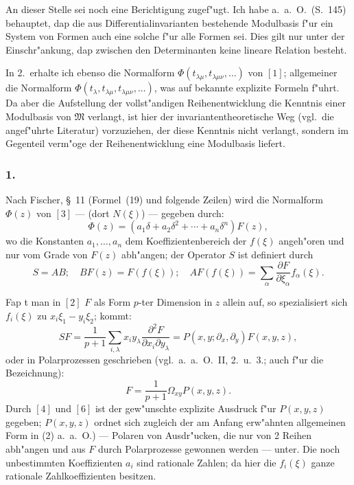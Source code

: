 \documentclass[12pt,a4paper]{article}
\begin{document}
An dieser Stelle sei noch eine Berichtigung zugef"ugt. Ich habe a.\ a.\ O.\ (S.~145) behauptet, dap die aus Differentialinvarianten bestehende Modulbasis f"ur ein System von Formen auch eine solche f"ur alle Formen sei. Dies gilt nur unter der Einschr"ankung, dap zwischen den Determinanten keine lineare Relation besteht.

In 2.\ erhalte ich ebenso die Normalform $\Phi(t_{\lambda\mu}, t_{\lambda\mu\nu}, \ldots)$ von $[1]$; allgemeiner die Normalform $\Phi(t_\lambda, t_{\lambda\mu}, t_{\lambda\mu\nu}, \ldots)$, was auf bekannte explizite Formeln f"uhrt. Da aber die Aufstellung der vollst"andigen Reihenentwicklung die Kenntnis einer Modulbasis von $\mathfrak{M}$ verlangt, ist hier der invariantentheoretische Weg (vgl.\ die angef"uhrte Literatur) vorzuziehen, der diese Kenntnis nicht verlangt, sondern im Gegenteil verm"oge der Reihenentwicklung eine Modulbasis liefert.

\subsubsection*{1.}

Nach Fischer, \S\ 11 (Formel~(19) und folgende Zeilen) wird die Normalform $\Phi(z)$ von $[3]$ --- (dort $N(\xi)$) --- gegeben durch:
\begin{equation}
\Phi(z) = (a_1\delta + a_2\delta^2 + \cdots + a_n\delta^n) F(z),
\end{equation}
wo die Konstanten $a_1,\ldots,a_n$ dem Koeffizientenbereich der $f(\xi)$ angeh"oren und nur vom Grade von $F(z)$ abh"angen; der Operator $S$ ist definiert durch
\begin{equation}
S = AB; \quad BF(z) = F(f(\xi)); \quad AF(f(\xi)) = \sum_\alpha \frac{\partial F}{\partial \xi_\alpha} f_\alpha(\xi).
\end{equation}

Fap t man in $[2]$ $F$ als Form $p$-ter Dimension in $z$ allein auf, so spezialisiert sich $f_i(\xi)$ zu $x_i\xi_1 - y_i\xi_2$; kommt:
\begin{equation}
SF = \frac{1}{p+1} \sum_{i,\lambda} x_i y_\lambda \frac{\partial^2 F}{\partial x_i \partial y_\lambda} = P(x,y;\partial_x,\partial_y) F(x,y,z),
\end{equation}
oder in Polarprozessen geschrieben (vgl.\ a.\ a.\ O.\ II, 2.\ u.\ 3.; auch f"ur die Bezeichnung):
\[
F = \frac{1}{p+1} \Omega_{xy} P(x,y,z).
\]
Durch $[4]$ und $[6]$ ist der gew"unschte explizite Ausdruck f"ur $P(x,y,z)$ gegeben; $P(x,y,z)$ ordnet sich zugleich der am Anfang erw"ahnten allgemeinen Form in (2) a.\ a.\ O.) --- Polaren von Ausdr"ucken, die nur von 2 Reihen abh"angen und aus $F$ durch Polarprozesse gewonnen werden --- unter. Die noch unbestimmten Koeffizienten $a_i$ sind rationale Zahlen; da hier die $f_i(\xi)$ ganze rationale Zahlkoeffizienten besitzen.
\end{document}

